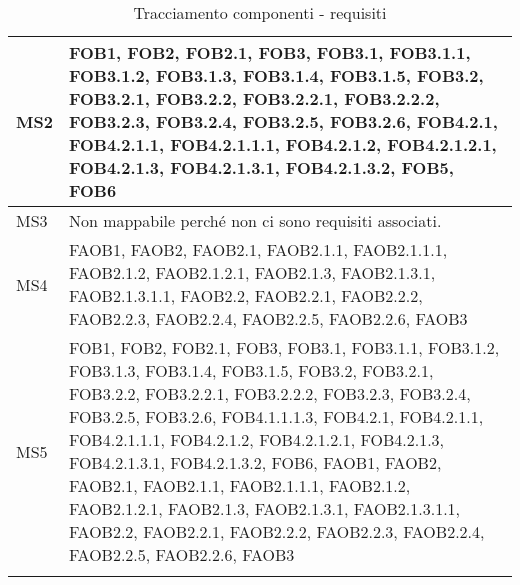 {{\begin{longtable}{p{} p{}}
\midrule
MS2		&	{FOB1, FOB2, FOB2.1, FOB3, FOB3.1, FOB3.1.1, FOB3.1.2, FOB3.1.3, FOB3.1.4, FOB3.1.5, FOB3.2, FOB3.2.1, FOB3.2.2, FOB3.2.2.1, FOB3.2.2.2, FOB3.2.3,  FOB3.2.4, FOB3.2.5, FOB3.2.6, FOB4.2.1, FOB4.2.1.1, FOB4.2.1.1.1, FOB4.2.1.2, FOB4.2.1.2.1, FOB4.2.1.3, FOB4.2.1.3.1, FOB4.2.1.3.2, FOB5, FOB6}\\
\midrule
MS3		&	{Non mappabile perché non ci sono requisiti associati.}\\
\midrule
MS4		&	{FAOB1, FAOB2, FAOB2.1, FAOB2.1.1, FAOB2.1.1.1, FAOB2.1.2, FAOB2.1.2.1, FAOB2.1.3, FAOB2.1.3.1, FAOB2.1.3.1.1, FAOB2.2, FAOB2.2.1, FAOB2.2.2, FAOB2.2.3, FAOB2.2.4, FAOB2.2.5, FAOB2.2.6, FAOB3}\\
\midrule
MS5		&	{FOB1, FOB2, FOB2.1, FOB3, FOB3.1, FOB3.1.1, FOB3.1.2, FOB3.1.3, FOB3.1.4, FOB3.1.5, FOB3.2, FOB3.2.1, FOB3.2.2, FOB3.2.2.1, FOB3.2.2.2, FOB3.2.3,  FOB3.2.4, FOB3.2.5, FOB3.2.6, FOB4.1.1.1.3, FOB4.2.1, FOB4.2.1.1, FOB4.2.1.1.1, FOB4.2.1.2, FOB4.2.1.2.1, FOB4.2.1.3, FOB4.2.1.3.1, FOB4.2.1.3.2, FOB6, FAOB1, FAOB2, FAOB2.1, FAOB2.1.1, FAOB2.1.1.1, FAOB2.1.2, FAOB2.1.2.1, FAOB2.1.3, FAOB2.1.3.1, FAOB2.1.3.1.1, FAOB2.2, FAOB2.2.1, FAOB2.2.2, FAOB2.2.3, FAOB2.2.4, FAOB2.2.5, FAOB2.2.6, FAOB3}\\
\bottomrule
\caption{Tracciamento componenti - requisiti}
\label{tab:tcr}
\end{longtable}
}
\newpage

}
